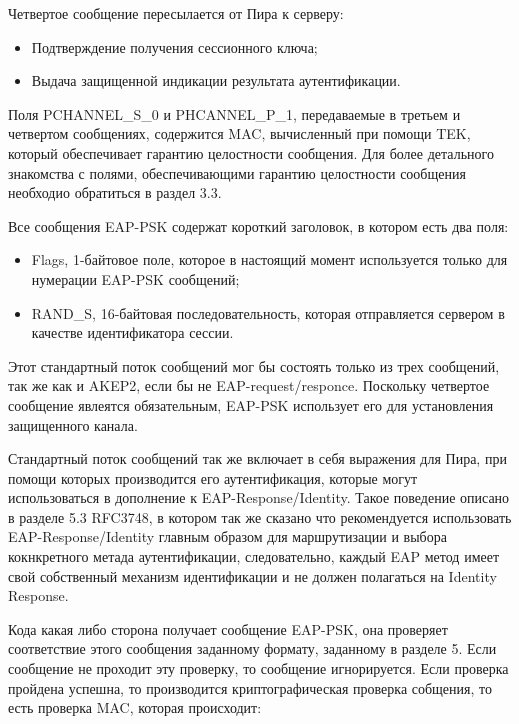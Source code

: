 Четвертое сообщение пересылается от Пира к серверу:

\begin{itemize}
\item Подтверждение получения сессионного ключа;
\item Выдача защищенной индикации результата аутентификации.
\end{itemize}

Поля PCHANNEL\_S\_0 и PHCANNEL\_P\_1, передаваемые в третьем и четвертом сообщениях, содержится MAC, вычисленный при помощи TEK, который обеспечивает гарантию целостности сообщения. Для более детального знакомства с полями, обеспечивающими гарантию целостности сообщения необходио обратиться в раздел 3.3.

Все сообщения EAP-PSK содержат короткий заголовок, в котором есть два поля:

\begin{itemize}
\item Flags, 1-байтовое поле, которое в настоящий момент используется только для нумерации EAP-PSK сообщений;
\item RAND\_S, 16-байтовая последовательность, которая отправляется сервером в качестве идентификатора сессии.
\end{itemize}

Этот стандартный поток сообщений мог бы состоять только из трех сообщений, так же как и AKEP2, если бы не EAP-request/responce. Поскольку четвертое сообщение явлеятся обязательным, EAP-PSK использует его для установления защищенного канала.

Стандартный поток сообщений так же включает в себя выражения для Пира, при помощи которых производится его аутентификация, которые могут использоваться в дополнение к EAP-Response/Identity. Такое поведение описано в разделе 5.3 RFC3748, в котором так же сказано что рекомендуется использовать EAP-Response/Identity главным образом для маршрутизации и выбора кокнкретного метада аутентификации, следовательно, каждый EAP метод имеет свой собственный механизм идентификации и не должен полагаться на Identity Response.

Кода какая либо сторона получает сообщение EAP-PSK, она проверяет соответствие этого сообщения заданному формату, заданному в разделе 5. Если сообщение не проходит эту проверку, то сообщение игнорируется. Если проверка пройдена успешна, то производится криптографическая проверка собщения, то есть проверка MAC, которая происходит:

